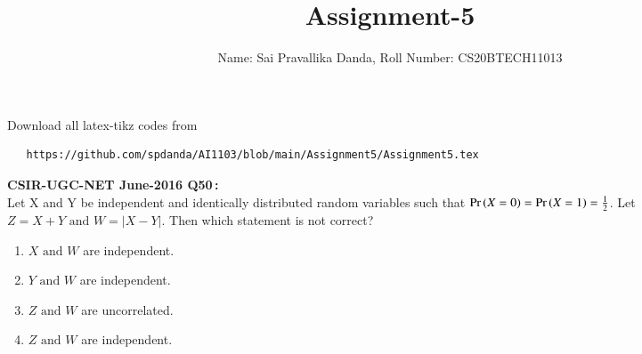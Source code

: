 \documentclass[journal,12pt,twocolumn]{IEEEtran}
\DeclareMathOperator*{\Res}{Res}
\begin{document}
\newcommand{\sgn}{\mathop{\mathrm{sgn}}}
\providecommand{\abs}[1]{\vert#1\vert}
\providecommand{\res}[1]{\Res\displaylimits_{#1}} 
\providecommand{\norm}[1]{\lVert#1\rVert}
\providecommand{\mtx}[1]{\mathbf{#1}}
\providecommand{\mean}[1]{E[ #1 ]}
\providecommand{\fourier}{\overset{\mathcal{F}}{ \rightleftharpoons}}
\providecommand{\system}{\overset{\mathcal{H}}{ \longleftrightarrow}}
\newcommand{\solution}{\noindent \textbf{Solution: }}
\newcommand{\cosec}{\,\text{cosec}\,}
\providecommand{\dec}[2]{\ensuremath{\overset{#1}{\underset{#2}{\gtrless}}}}
\newcommand{\myvec}[1]{\ensuremath{\begin{pmatrix}#1\end{pmatrix}}}
\newcommand{\mydet}[1]{\ensuremath{\begin{vmatrix}#1\end{vmatrix}}}
\makeatletter
{}
\makeatother
\let\StandardTheFigure\thefigure
\let\vec\mathbf
\renewcommand{\thefigure}{\theproblem}
\def\putbox#1#2#3{\makebox[0in][l]{\makebox[#1][l]{}\raisebox{\baselineskip}[0in][0in]{\raisebox{#2}[0in][0in]{#3}}}}
     \def\rightbox#1{\makebox[0in][r]{#1}}
     \def\centbox#1{\makebox[0in]{#1}}
     \def\topbox#1{\raisebox{-\baselineskip}[0in][0in]{#1}}
     \def\midbox#1{\raisebox{-0.5\baselineskip}[0in][0in]{#1}}
\vspace{3cm}
\title{Assignment-5}
\author{Name: Sai Pravallika Danda, Roll Number: CS20BTECH11013}
\maketitle
\newpage
\bigskip
\renewcommand{\thefigure}{\theenumi}
\renewcommand{\thetable}{\theenumi}
Download all latex-tikz codes from
\begin{lstlisting}
   https://github.com/spdanda/AI1103/blob/main/Assignment5/Assignment5.tex
\end{lstlisting}
\large\textbf{CSIR-UGC-NET June-2016 Q50\,:}\\
 Let X and Y be independent and identically distributed random variables such that \(\Pr\left(X=0\right)=\Pr\left(X=1\right)= \frac{1}{2}\). Let \(Z = X+Y \text{ and } W = \abs{X-Y}\). Then which statement is not correct?
 \begin{enumerate}
     \item $X \text{ and } W$ are independent.
     \item $Y \text{ and } W$ are independent.
     \item $Z \text{ and } W$ are uncorrelated.
     \item $Z \text{ and } W$ are independent.
 \end{enumerate}
\end{document}

